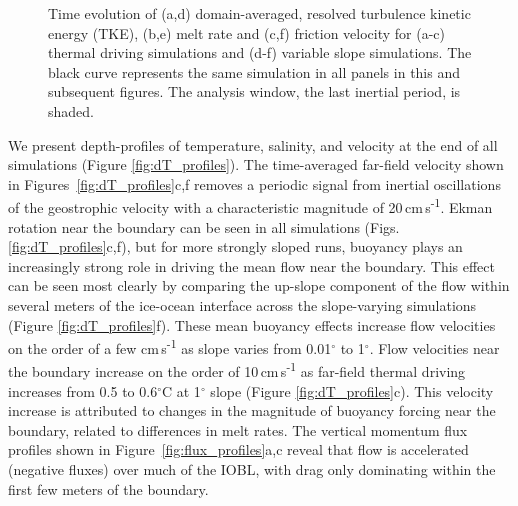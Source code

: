 \documentclass[draft]{styles/agujournal2019}
\begin{document}
\begin{figure}[h!]
\begin{minipage}{0.33\textwidth}
    \end{minipage}
    \caption{Time evolution of (a,d) domain-averaged, resolved turbulence kinetic energy (TKE), (b,e) melt rate and (c,f) friction velocity for (a-c) thermal driving simulations and (d-f) variable slope simulations. The black curve represents the same simulation in all panels in this and subsequent figures. The analysis window, the last inertial period, is shaded.}
    \label{fig:timeseries}
\end{figure}

We present depth-profiles of temperature, salinity, and velocity at the end of all simulations (Figure \ref{fig:dT_profiles}). The time-averaged far-field velocity shown in Figures~\ref{fig:dT_profiles}c,f removes a periodic signal from inertial oscillations of the geostrophic velocity with a characteristic magnitude of 20\,cm\,s\textsuperscript{-1}. Ekman rotation near the boundary can be seen in all simulations (Figs. \ref{fig:dT_profiles}c,f), but for more strongly sloped runs, buoyancy plays an increasingly strong role in driving the mean flow near the boundary. This effect can be seen most clearly by comparing the up-slope component of the flow within several meters of the ice-ocean interface across the slope-varying simulations (Figure \ref{fig:dT_profiles}f). These mean buoyancy effects increase flow velocities on the order of a few cm\,s\textsuperscript{-1} as slope varies from 0.01$^{\circ}$ to 1$^{\circ}$. Flow velocities near the boundary increase on the order of 10\,cm\,s\textsuperscript{-1} as far-field thermal driving increases from 0.5 to 0.6$^{\circ}$C at 1$^{\circ}$ slope (Figure \ref{fig:dT_profiles}c). This velocity increase is attributed to changes in the magnitude of buoyancy forcing near the boundary, related to differences in melt rates. The vertical momentum flux profiles shown in Figure~\ref{fig:flux_profiles}a,c reveal that flow is accelerated (negative fluxes) over much of the IOBL, with drag only dominating within the first few meters of the boundary.
 
\end{document}

